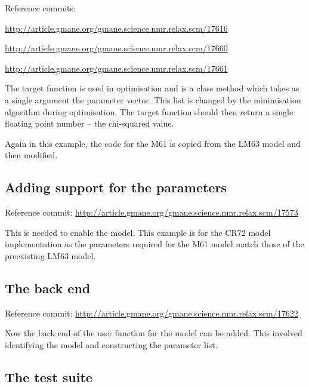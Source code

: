 Reference commits:

\href{http://article.gmane.org/gmane.science.nmr.relax.scm/17616}{http://article.gmane.org/gmane.science.nmr.relax.scm/17616}

\href{http://article.gmane.org/gmane.science.nmr.relax.scm/17660}{http://article.gmane.org/gmane.science.nmr.relax.scm/17660}

\href{http://article.gmane.org/gmane.science.nmr.relax.scm/17661}{http://article.gmane.org/gmane.science.nmr.relax.scm/17661}

The target function is used in optimisation and is a class method which takes as a single argument the parameter vector.  This list is changed by the minimisation algorithm during optimisation.  The target function should then return a single floating point number -- the chi-squared value.

Again in this example, the code for the M61 is copied from the LM63 model and then modified.


\subsection{Adding support for the parameters}

Reference commit:  \href{http://article.gmane.org/gmane.science.nmr.relax.scm/17573}{http://article.gmane.org/gmane.science.nmr.relax.scm/17573}

This is needed to enable the model.  This example is for the CR72 model implementation as the parameters required for the M61 model match those of the preexisting LM63 model.


\subsection{The  back end}

Reference commit:  \href{http://article.gmane.org/gmane.science.nmr.relax.scm/17622}{http://article.gmane.org/gmane.science.nmr.relax.scm/17622}

Now the back end of the  user function for the model can be added.  This involved identifying the model and constructing the parameter list.


\subsection{The test suite}
\label{sect: test suite for dispersion}

